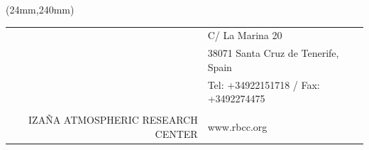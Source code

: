 \begin{center}
\begin{textblock*}{180mm}(24mm,240mm)
\begin{table}[h!]
  \begin{tabular}{r!{{\vrule width 1.2pt}}l}
    & {C/ La Marina 20} \\
    & {38071 Santa Cruz de Tenerife, Spain} \\
    & {Tel: +34922151718 / Fax: +3492274475} \\
    & \\
    {IZA\~NA ATMOSPHERIC RESEARCH CENTER} & {www.rbcc.org}
  \end{tabular}
\end{table}
\end{textblock*}

\end{center}

\null\newpage